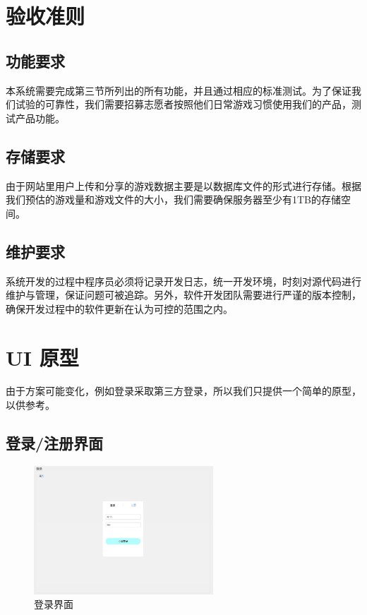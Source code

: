 \documentclass[12pt]{ctexart} %
\begin{document}
\section{验收准则}
\subsection{功能要求}
本系统需要完成第三节所列出的所有功能，并且通过相应的标准测试。为了保证我们试验的可靠性，我们需要招募志愿者按照他们日常游戏习惯使用我们的产品，测试产品功能。

\subsection{存储要求}
由于网站里用户上传和分享的游戏数据主要是以数据库文件的形式进行存储。根据我们预估的游戏量和游戏文件的大小，我们需要确保服务器至少有1TB的存储空间。
\subsection{维护要求}
系统开发的过程中程序员必须将记录开发日志，统一开发环境，时刻对源代码进行维护与管理，保证问题可被追踪。另外，软件开发团队需要进行严谨的版本控制，确保开发过程中的软件更新在认为可控的范围之内。
\section{UI 原型}

由于方案可能变化，例如登录采取第三方登录，所以我们只提供一个简单的原型，以供参考。

\subsection{登录/注册界面}

\begin{figure}[htbp]
  \centering
  \includegraphics[width=0.6\textwidth]{login.jpg}
  \caption{登录界面}
\end{figure}
\end{document}
